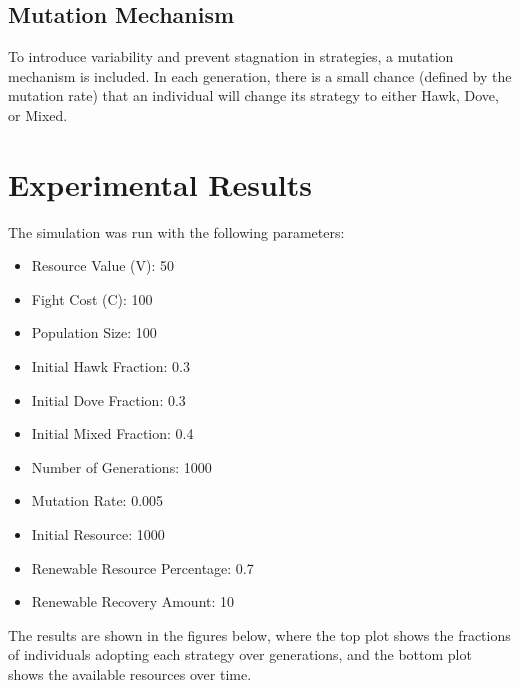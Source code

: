\documentclass{article}
\begin{document}
\subsection{Mutation Mechanism}
To introduce variability and prevent stagnation in strategies, a mutation mechanism is included. In each generation, there is a small chance (defined by the mutation rate) that an individual will change its strategy to either Hawk, Dove, or Mixed.

\section{Experimental Results}
The simulation was run with the following parameters:
\begin{itemize}
    \item Resource Value (V): 50
    \item Fight Cost (C): 100
    \item Population Size: 100
    \item Initial Hawk Fraction: 0.3
    \item Initial Dove Fraction: 0.3
    \item Initial Mixed Fraction: 0.4
    \item Number of Generations: 1000
    \item Mutation Rate: 0.005
    \item Initial Resource: 1000
    \item Renewable Resource Percentage: 0.7
    \item Renewable Recovery Amount: 10
\end{itemize}

The results are shown in the figures below, where the top plot shows the fractions of individuals adopting each strategy over generations, and the bottom plot shows the available resources over time.
\end{document}
